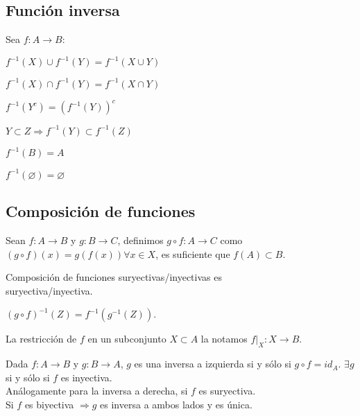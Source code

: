 \subsection{Función inversa}

Sea \(f: A \to B\):

\begin{prop}
    \(f^{-1}(X) \cup f^{-1}(Y) = f^{-1}(X \cup Y)\)
\end{prop}

\begin{prop}
    \(f^{-1}(X) \cap f^{-1}(Y) = f^{-1}(X \cap Y)\)
\end{prop}

\begin{prop}
    \(f^{-1}(Y^c) = (f^{-1}(Y))^c\)
\end{prop}

\begin{prop}
    \(Y \subset Z \Rightarrow f^{-1}(Y) \subset f^{-1}(Z)\)
\end{prop}

\begin{prop}
    \(f^{-1}(B) = A\)
\end{prop}

\begin{prop}
    \(f^{-1}(\varnothing) = \varnothing\)
\end{prop}

\subsection{Composición de funciones}

Sean \(f: A \to B\) y \(g: B \to C\), definimos \(g \circ f: A \to C\) como \((g \circ f)(x) = g(f(x)) \forall x \in X\), es suficiente que \(f(A) \subset B\).

\begin{prop}
    Composición de funciones suryectivas/inyectivas es \\ suryectiva/inyectiva.
\end{prop}

\begin{prop}
    \((g \circ f)^{-1}(Z) = f^{-1}(g^{-1}(Z))\).
\end{prop}

\begin{definition}
    La restricción de \(f\) en un subconjunto \(X \subset A\) la notamos \(f|_X: X \to B\).
\end{definition}

\begin{definition}
    Dada \(f: A \to B\) y \(g: B \to A\), \(g\) es una inversa a izquierda si y sólo si \(g \circ f = id_A\). \(\exists g\) si y sólo si \(f\) es inyectiva. \\
    Análogamente para la inversa a derecha, si \(f\) es suryectiva. \\
    Si \(f\) es biyectiva \(\Rightarrow g\) es inversa a ambos lados y es única.
\end{definition}

